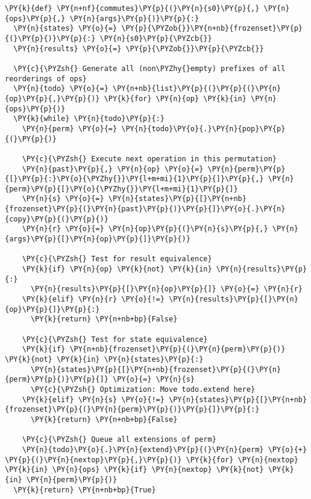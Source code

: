 \begin{Verbatim}[commandchars=\\\{\}]
\PY{k}{def} \PY{n+nf}{commutes}\PY{p}{(}\PY{n}{s0}\PY{p}{,} \PY{n}{ops}\PY{p}{,} \PY{n}{args}\PY{p}{)}\PY{p}{:}
  \PY{n}{states} \PY{o}{=} \PY{p}{\PYZob{}}\PY{n+nb}{frozenset}\PY{p}{(}\PY{p}{)}\PY{p}{:} \PY{n}{s0}\PY{p}{\PYZcb{}}
  \PY{n}{results} \PY{o}{=} \PY{p}{\PYZob{}}\PY{p}{\PYZcb{}}

  \PY{c}{\PYZsh{} Generate all (non\PYZhy{}empty) prefixes of all reorderings of ops}
  \PY{n}{todo} \PY{o}{=} \PY{n+nb}{list}\PY{p}{(}\PY{p}{(}\PY{n}{op}\PY{p}{,}\PY{p}{)} \PY{k}{for} \PY{n}{op} \PY{k}{in} \PY{n}{ops}\PY{p}{)}
  \PY{k}{while} \PY{n}{todo}\PY{p}{:}
    \PY{n}{perm} \PY{o}{=} \PY{n}{todo}\PY{o}{.}\PY{n}{pop}\PY{p}{(}\PY{p}{)}

    \PY{c}{\PYZsh{} Execute next operation in this permutation}
    \PY{n}{past}\PY{p}{,} \PY{n}{op} \PY{o}{=} \PY{n}{perm}\PY{p}{[}\PY{p}{:}\PY{o}{\PYZhy{}}\PY{l+m+mi}{1}\PY{p}{]}\PY{p}{,} \PY{n}{perm}\PY{p}{[}\PY{o}{\PYZhy{}}\PY{l+m+mi}{1}\PY{p}{]}
    \PY{n}{s} \PY{o}{=} \PY{n}{states}\PY{p}{[}\PY{n+nb}{frozenset}\PY{p}{(}\PY{n}{past}\PY{p}{)}\PY{p}{]}\PY{o}{.}\PY{n}{copy}\PY{p}{(}\PY{p}{)}
    \PY{n}{r} \PY{o}{=} \PY{n}{op}\PY{p}{(}\PY{n}{s}\PY{p}{,} \PY{n}{args}\PY{p}{[}\PY{n}{op}\PY{p}{]}\PY{p}{)}

    \PY{c}{\PYZsh{} Test for result equivalence}
    \PY{k}{if} \PY{n}{op} \PY{k}{not} \PY{k}{in} \PY{n}{results}\PY{p}{:}
      \PY{n}{results}\PY{p}{[}\PY{n}{op}\PY{p}{]} \PY{o}{=} \PY{n}{r}
    \PY{k}{elif} \PY{n}{r} \PY{o}{!=} \PY{n}{results}\PY{p}{[}\PY{n}{op}\PY{p}{]}\PY{p}{:}
      \PY{k}{return} \PY{n+nb+bp}{False}

    \PY{c}{\PYZsh{} Test for state equivalence}
    \PY{k}{if} \PY{n+nb}{frozenset}\PY{p}{(}\PY{n}{perm}\PY{p}{)} \PY{k}{not} \PY{k}{in} \PY{n}{states}\PY{p}{:}
      \PY{n}{states}\PY{p}{[}\PY{n+nb}{frozenset}\PY{p}{(}\PY{n}{perm}\PY{p}{)}\PY{p}{]} \PY{o}{=} \PY{n}{s}
      \PY{c}{\PYZsh{} Optimization: Move todo.extend here}
    \PY{k}{elif} \PY{n}{s} \PY{o}{!=} \PY{n}{states}\PY{p}{[}\PY{n+nb}{frozenset}\PY{p}{(}\PY{n}{perm}\PY{p}{)}\PY{p}{]}\PY{p}{:}
      \PY{k}{return} \PY{n+nb+bp}{False}

    \PY{c}{\PYZsh{} Queue all extensions of perm}
    \PY{n}{todo}\PY{o}{.}\PY{n}{extend}\PY{p}{(}\PY{n}{perm} \PY{o}{+} \PY{p}{(}\PY{n}{nextop}\PY{p}{,}\PY{p}{)} \PY{k}{for} \PY{n}{nextop} \PY{k}{in} \PY{n}{ops} \PY{k}{if} \PY{n}{nextop} \PY{k}{not} \PY{k}{in} \PY{n}{perm}\PY{p}{)}
  \PY{k}{return} \PY{n+nb+bp}{True}
\end{Verbatim}
